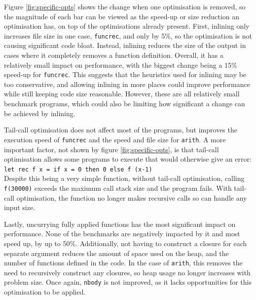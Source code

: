 Figure \ref{fig:specific-opts} shows the change when one optimisation is removed, so the magnitude of each bar can be viewed as the speed-up or size reduction an optimisation has, on top of the optimisations already present. First, inlining only increases file size in one case, \verb|funcrec|, and only by 5\%, so the optimisation is not causing significant code bloat. Instead, inlining reduces the size of the output in cases where it completely removes a function definition. Overall, it has a relatively small impact on performance, with the biggest change being a 15\% speed-up for \verb|funcrec|. This suggests that the heuristics used for inlining may be too conservative, and allowing inlining in more places could improve performance while still keeping code size reasonable. However, these are all relatively small benchmark programs, which could also be limiting how significant a change can be achieved by inlining. %

Tail-call optimisation does not affect most of the programs, but improves the execution speed of \verb|funcrec| and the speed and file size for \verb|arith|. A more important factor, not shown by figure \ref{fig:specific-opts}, is that tail-call optimisation allows some programs to execute that would otherwise give an error: \\
\verb|let rec f x = if x = 0 then 0 else f (x-1)| \\
Despite this being a very simple function, without tail-call optimisation, calling \verb|f(30000)| exceeds the maximum call stack size and the program fails. With tail-call optimisation, the function no longer makes recursive calls so can handle any input size.

Lastly, uncurrying fully applied functions has the most significant impact on performance. None of the benchmarks are negatively impacted by it and most speed up, by up to 50\%. Additionally, not having to construct a closure for each separate argument reduces the amount of space used on the heap, and the number of functions defined in the code. In the case of \verb|arith|, this removes the need to recursively construct any closures, so heap usage no longer increases with problem size. Once again, \verb|nbody| is not improved, as it lacks opportunities for this optimisation to be applied.

